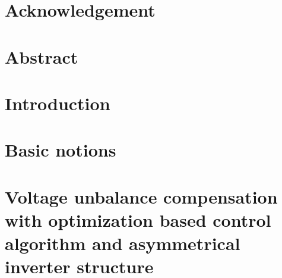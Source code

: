 \documentclass[12pt, a4paper, oneside, table]{report}
\begin{document}

 \null
 \thispagestyle{empty}%
 \addtocounter{page}{-1}%
 \newpage

 

 

 \chapter*{Acknowledgement}
 

% 

 \chapter*{Abstract}
 

 \thispagestyle{plain}
 \tableofcontents
 \newpage

\chapter{Introduction}
 


 \chapter{Basic notions}

 
 
 
	\chapter{Voltage unbalance compensation with optimization based control algorithm and asymmetrical inverter structure}
	
\end{document}
